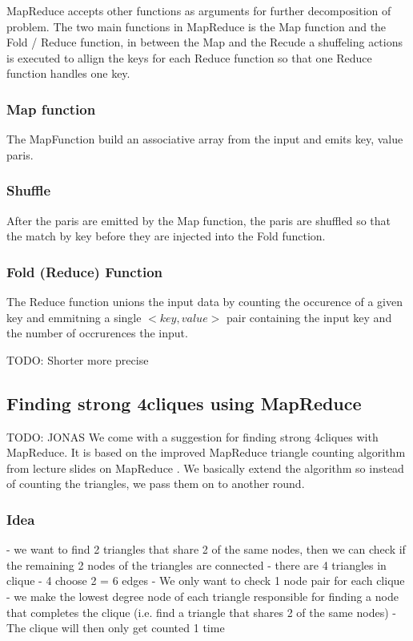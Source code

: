 \documentclass{article}
\begin{document}
\noindent MapReduce accepts other functions as arguments for further decomposition of problem. The two main functions in MapReduce is the Map function and the Fold / Reduce function, in between the Map and the Recude a shuffeling actions is executed to allign the keys for each Reduce function so that one Reduce function handles one key.

\subsubsection{Map function}
The MapFunction build an associative array from the input and emits key, value paris.

\subsubsection{Shuffle}
After the paris are emitted by the Map function, the paris are shuffled so that the match by key before they are injected into the Fold function.

\subsubsection{Fold (Reduce) Function}
The Reduce function unions the input data by counting the occurence of a given key and emmitning a single $<key,value>$ pair containing the input key and the number of occrurences the input.

TODO: Shorter more precise

\subsection{Finding strong 4cliques using MapReduce}
TODO: JONAS
We come with a suggestion for finding strong 4cliques with MapReduce. It is based on the improved MapReduce triangle counting algorithm from lecture slides on MapReduce \cite{lnMapReduce}. We basically extend the algorithm so instead of counting the triangles, we pass them on to another round.

\subsubsection{Idea}
- we want to find 2 triangles that share 2 of the same nodes, then we can check if the remaining 2 nodes of the triangles are connected
- there are 4 triangles in clique - 4 choose 2 = 6 edges
- We only want to check 1 node pair for each clique
- we make the lowest degree node of each triangle responsible for finding a node that completes the clique (i.e. find a triangle that shares 2 of the same nodes)
- The clique will then only get counted 1 time
\end{document}
